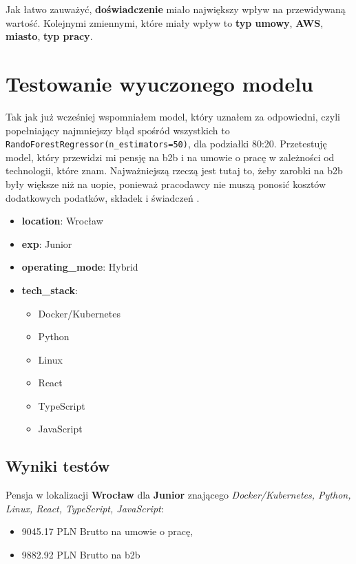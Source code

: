 \documentclass[a4paper]{article}
\begin{document}
\quad Jak łatwo zauważyć, \textbf{doświadczenie} miało największy wpływ na przewidywaną wartość.
Kolejnymi zmiennymi, które miały wpływ to \textbf{typ umowy}, \textbf{AWS}, \textbf{miasto}, \textbf{typ pracy}.

\newpage

\section{Testowanie wyuczonego modelu}

\quad Tak jak już wcześniej wspomniałem model, który uznałem za odpowiedni, czyli popełniający najmniejszy błąd
spośród wszystkich to \texttt{RandoForestRegressor(n\_estimators=50)}, dla podziałki 80:20.
Przetestuję model, który przewidzi mi pensję na b2b i na umowie o pracę w zależności od technologii, które znam. Najważniejszą rzeczą jest tutaj to, żeby zarobki na b2b były większe niż na uopie,
ponieważ pracodawcy nie muszą ponosić kosztów dodatkowych podatków, składek i świadczeń \cite{uop_vs_b2b}.

\begin{itemize}
    \item \textbf{location}: Wrocław
    \item \textbf{exp}: Junior
    \item \textbf{operating\_mode}: Hybrid
    \item \textbf{tech\_stack}:
          \begin{itemize}
              \item Docker/Kubernetes
              \item Python
              \item Linux
              \item React
              \item TypeScript
              \item JavaScript
          \end{itemize}
\end{itemize}

\subsection{Wyniki testów}

\quad Pensja w lokalizacji \textbf{Wrocław} dla \textbf{Junior} znającego \textit{Docker/Kubernetes, Python, Linux, React, TypeScript, JavaScript}:

\begin{itemize}
    \item 9045.17 PLN Brutto na umowie o pracę,
    \item 9882.92 PLN Brutto na b2b
\end{itemize}
\end{document}
